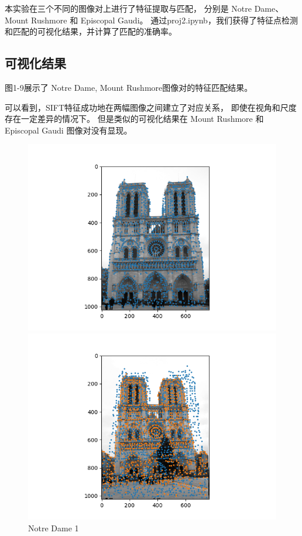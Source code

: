 本实验在三个不同的图像对上进行了特征提取与匹配，
分别是 Notre Dame、Mount Rushmore 和 Episcopal Gaudi。
通过proj2.ipynb，我们获得了特征点检测和匹配的可视化结果，并计算了匹配的准确率。

\subsection{可视化结果}
图1-9展示了 Notre Dame, Mount Rushmore图像对的特征匹配结果。

可以看到，SIFT特征成功地在两幅图像之间建立了对应关系，
即使在视角和尺度存在一定差异的情况下。
但是类似的可视化结果在 Mount Rushmore 和 Episcopal Gaudi 图像对没有显现。
\begin{figure}[h!]
    \centering
    \begin{minipage}[b]{0.3\textwidth}
        \includegraphics[width=\textwidth]{imgs/notre_dame1.png}
        \caption{Notre Dame 1}
    \end{minipage}
    \begin{minipage}[b]{0.3\textwidth}
        \includegraphics[width=\textwidth]{imgs/notre_dame2.png}

\end{minipage}
\end{figure}
